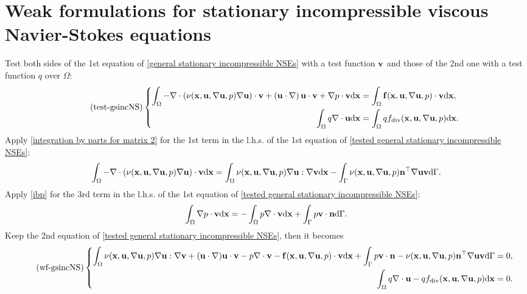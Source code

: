 \documentclass[oneside]{book}
\numberwithin{equation}{section}
\begin{document}
\section{Weak formulations for stationary incompressible viscous Navier-Stokes equations}
Test both sides of the 1st equation of \eqref{general stationary incompressible NSEs} with a test function ${\bf v}$ and those of the 2nd one with a test function $q$ over $\Omega$:
\begin{equation}
    \label{tested general stationary incompressible NSEs}
    \tag{test-gsincNS}
    \left\{\begin{split}
        \int_\Omega -\nabla\cdot\left(\nu({\bf x},{\bf u},\nabla{\bf u},p)\nabla{\bf u}\right)\cdot{\bf v} + \left({\bf u}\cdot\nabla\right){\bf u}\cdot{\bf v} + \nabla p\cdot{\bf v}{\rm d}{\bf x} &= \int_\Omega {\bf f}({\bf x},{\bf u},\nabla{\bf u},p)\cdot{\bf v}{\rm d}{\bf x},\\
        \int_\Omega q\nabla\cdot{\bf u}{\rm d}{\bf x} &= \int_\Omega qf_{\rm div}({\bf x},{\bf u},\nabla{\bf u},p){\rm d}{\bf x}.
    \end{split}\right.
\end{equation}
Apply \eqref{integration by parts for matrix 2} for the 1st term in the l.h.s. of the 1st equation of \eqref{tested general stationary incompressible NSEs}:
\begin{align*}
    \int_\Omega -\nabla\cdot\left(\nu({\bf x},{\bf u},\nabla{\bf u},p)\nabla{\bf u}\right)\cdot{\bf v}{\rm d}{\bf x} = \int_\Omega \nu({\bf x},{\bf u},\nabla{\bf u},p)\nabla{\bf u}:\nabla{\bf v}{\rm d}{\bf x} - \int_\Gamma \nu({\bf x},{\bf u},\nabla{\bf u},p){\bf n}^\top\nabla{\bf u}{\bf v}{\rm d}\Gamma.
\end{align*}
Apply \eqref{ibp} for the 3rd term in the l.h.s. of the 1st equation of \eqref{tested general stationary incompressible NSEs}:
\begin{align*}
    \int_\Omega \nabla p\cdot{\bf v}{\rm d}{\bf x} = -\int_\Omega p\nabla\cdot{\bf v}{\rm d}{\bf x} + \int_\Gamma p{\bf v}\cdot{\bf n}{\rm d}\Gamma.
\end{align*} 
Keep the 2nd equation of \eqref{tested general stationary incompressible NSEs}, then it becomes
\begin{equation}
    \label{weak formulation of general stationary incompressible NSEs}
    \tag{wf-gsincNS}
    \left\{\begin{split}
        \int_\Omega \nu({\bf x},{\bf u},\nabla{\bf u},p)\nabla{\bf u}:\nabla{\bf v} + ({\bf u}\cdot\nabla){\bf u}\cdot{\bf v} - p\nabla\cdot{\bf v} - {\bf f}({\bf x},{\bf u},\nabla{\bf u},p)\cdot{\bf v}{\rm d}{\bf x} + \int_\Gamma p{\bf v}\cdot{\bf n} - \nu({\bf x},{\bf u},\nabla{\bf u},p){\bf n}^\top\nabla{\bf u}{\bf v}{\rm d}\Gamma &= 0,\\
        \int_\Omega q\nabla\cdot{\bf u} - qf_{\rm div}({\bf x},{\bf u},\nabla{\bf u},p){\rm d}{\bf x} &= 0.
    \end{split}\right.    
\end{equation}
\end{document}

